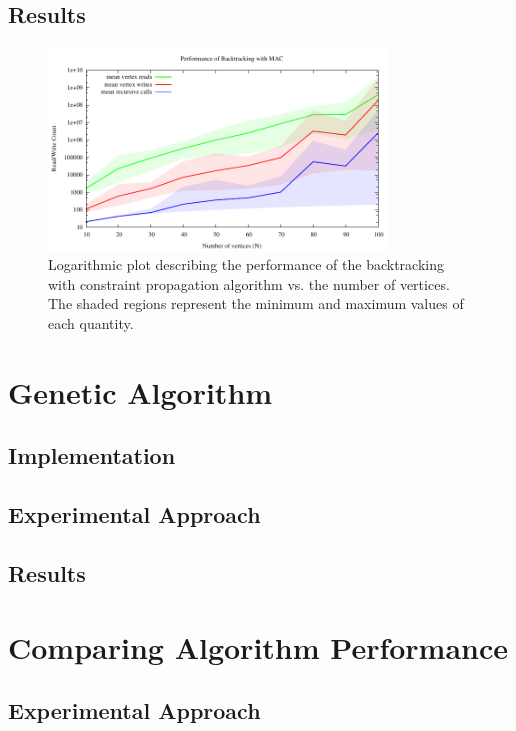 \documentclass{article}
\begin{document}
	\subsection{Results}
	
		\begin{figure}[h!]
			\centering
			\includegraphics[width=0.8\textwidth]{../results_5/backtracking_mac/bt_mac_performance}
			\caption{Logarithmic plot describing the performance of the backtracking with constraint propagation algorithm vs. the number of vertices. The shaded regions represent the minimum and maximum values of each quantity.}
		\end{figure}
	
\section{Genetic Algorithm}

	\subsection{Implementation}

	\subsection{Experimental Approach}
	
	\subsection{Results}
	
\section{Comparing Algorithm Performance}
	\label{comparisons}
	
	\subsection{Experimental Approach}
	
\end{document}
